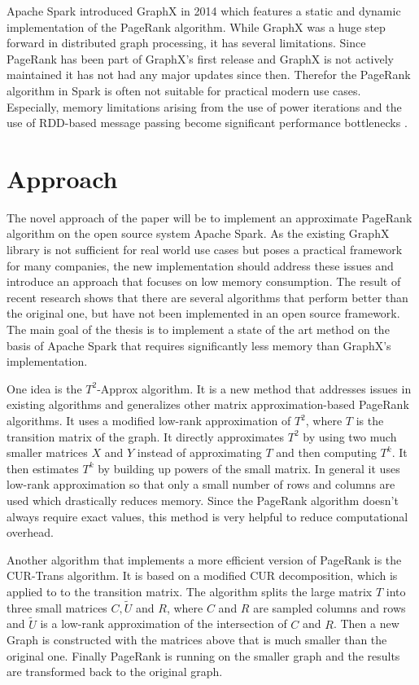 \documentclass[a4paper,12pt]{article}
\begin{document}
\begin{multicols}{2}
Apache Spark introduced GraphX in 2014 which features a static and dynamic implementation of the PageRank algorithm. While GraphX was a huge step forward in distributed graph processing, it has several limitations. Since PageRank has been part of GraphX's first release and GraphX is not actively maintained it has not had any major updates since then. Therefor the PageRank algorithm in Spark is often not suitable for practical modern use cases. Especially, memory limitations arising from the use of power iterations and the use of RDD-based message passing become significant performance bottlenecks \cite{xin_graphx_2013}.
 

\section{Approach}
The novel approach of the paper will be to implement an approximate PageRank algorithm on the open source system Apache Spark. As the existing GraphX library is not sufficient for real world use cases but poses a practical framework for many companies, the new implementation should address these issues and introduce an approach that focuses on low memory consumption. 
The result of recent research shows that there are several algorithms that perform better than the original one, but have not been implemented in an open source framework. The main goal of the thesis is to implement a state of the art method on the basis of Apache Spark that requires significantly less memory than GraphX's implementation. 

One idea is the $T^2$-Approx algorithm. It is a new method that addresses issues in existing algorithms and generalizes other matrix approximation-based PageRank algorithms. It uses a modified low-rank approximation of $T^2$, where $T$ is the transition matrix of the graph. It directly approximates $T^2$ by using two much smaller matrices $X$ and $Y$ instead of approximating $T$ and then computing $T^k$. It then estimates $T^k$ by building up powers of the small matrix. In general it uses low-rank approximation so that only a small number of rows and columns are used which drastically reduces memory. Since the PageRank algorithm doesn't always require exact values, this method is very helpful to reduce computational overhead.

Another algorithm that implements a more efficient version of PageRank is the CUR-Trans algorithm. It is based on a modified CUR decomposition, which is applied to to the transition matrix. The algorithm splits the large matrix $T$ into three small matrices $C, \tilde{U}$ and $R$, where $C$ and $R$ are sampled columns and rows and $\tilde{U}$ is a low-rank approximation of the intersection of $C$ and $R$. Then a new Graph is constructed with the matrices above that is much smaller than the original one. Finally PageRank is running on the smaller graph and the results are transformed back to the original graph.


\end{multicols}
\end{document}
